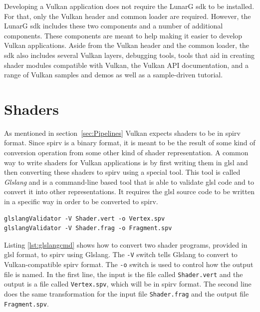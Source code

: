     Developing a Vulkan application does not require the LunarG \gls{sdk} to be installed. For that, only the Vulkan header and common loader are required. However, the LunarG \gls{sdk} includes these two components and a number of additional components. These components are meant to help making it easier to develop Vulkan applications. Aside from the Vulkan header and the common loader, the \gls{sdk} also includes several Vulkan layers, debugging tools, tools that aid in creating shader modules compatible with Vulkan, the Vulkan API documentation, and a range of Vulkan samples and demos as well as a sample-driven tutorial.


  \section{Shaders}
  \label{sec:EnvShaders}
    As mentioned in section~\ref{sec:Pipelines} Vulkan expects shaders to be in \gls{spirv} format. Since \gls{spirv} is a binary format, it is meant to be the result of some kind of conversion operation from some other kind of shader representation. A common way to write shaders for Vulkan applications is by first writing them in \gls{glsl} and then converting these shaders to \gls{spirv} using a special tool. This tool is called \textit{Glslang}\cite{glslangrepo} and is a command-line based tool that is able to validate \gls{glsl} code and to convert it into other representations. It requires the \gls{glsl} source code to be written in a specific way in order to be converted to \gls{spirv}.

    \begin{lstlisting}[label=lst:glslangcmd]
glslangValidator -V Shader.vert -o Vertex.spv
glslangValidator -V Shader.frag -o Fragment.spv\end{lstlisting}

    Listing \ref{lst:glslangcmd} shows how to convert two shader programs, provided in \gls{glsl} format, to \gls{spirv} using Glslang. The \lstinline{-V} switch tells Glslang to convert to Vulkan-compatible \gls{spirv} format. The \lstinline{-o} switch is used to control how the output file is named. In the first line, the input is the file called \lstinline{Shader.vert} and the output is a file called \lstinline{Vertex.spv}, which will be in \gls{spirv} format. The second line does the same transformation for the input file \lstinline{Shader.frag} and the output file \lstinline{Fragment.spv}.

